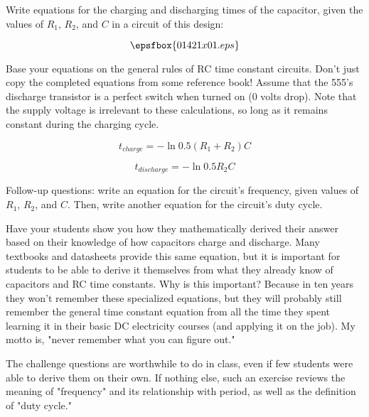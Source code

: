 

Write equations for the charging and discharging times of the capacitor, given the values of $R_1$, $R_2$, and $C$ in a circuit of this design:

$$\epsfbox{01421x01.eps}$$

Base your equations on the general rules of RC time constant circuits.  Don't just copy the completed equations from some reference book!  Assume that the 555's discharge transistor is a perfect switch when turned on (0 volts drop).  Note that the supply voltage is irrelevant to these calculations, so long as it remains constant during the charging cycle.







$$t_{charge} = - \ln 0.5 (R_1 + R_2) C$$

$$t_{discharge} = - \ln 0.5 R_2 C$$

\vskip 10pt

Follow-up questions: write an equation for the circuit's frequency, given values of $R_1$, $R_2$, and $C$.  Then, write another equation for the circuit's duty cycle.







Have your students show you how they mathematically derived their answer based on their knowledge of how capacitors charge and discharge.  Many textbooks and datasheets provide this same equation, but it is important for students to be able to derive it themselves from what they already know of capacitors and RC time constants.  Why is this important?  Because in ten years they won't remember these specialized equations, but they will probably still remember the general time constant equation from all the time they spent learning it in their basic DC electricity courses (and applying it on the job).  My motto is, "never remember what you can figure out."

The challenge questions are worthwhile to do in class, even if few students were able to derive them on their own.  If nothing else, such an exercise reviews the meaning of "frequency" and its relationship with period, as well as the definition of "duty cycle."




